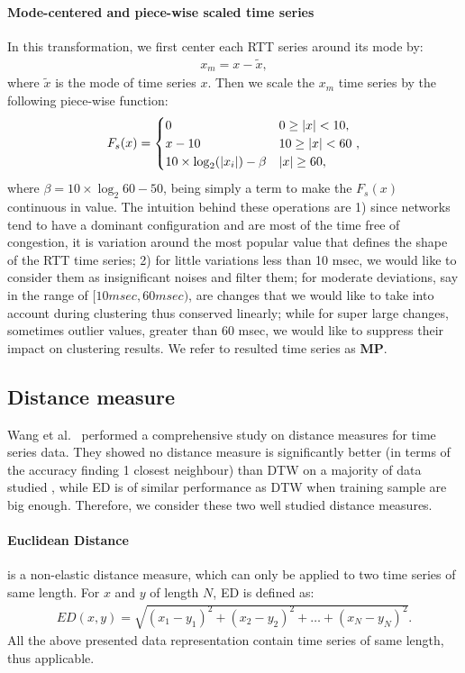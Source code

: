 \paragraph*{Mode-centered and piece-wise scaled time series}  In this transformation, we first center each RTT series around its mode by:
\begin{align*}
x_m = x-\tilde x,
\end{align*}
where $\tilde x$ is the mode of time series $x$. Then we scale the $x_m$ time series by the following piece-wise function:
\begin{align*}
F_s(x) =
\begin{cases} 
       0    \hfill & \text{$0 \geq |x| < 10$}, \\
       x-10 \hfill & \text{$10 \geq |x| < 60$ }, \\
       10 \times \log_2 (|x_i|) - \beta \hfill & \text{$|x|\geq 60$},\\
  \end{cases}
\end{align*}
where $\beta = 10 \times \log_2 60 - 50$, being simply a term to make the $F_s(x)$ continuous in value. 
The intuition behind these operations are 1) since networks tend to have a dominant configuration and are most of the time free of congestion, it is variation around the most popular value that defines the shape of the RTT time series; 2) for little variations less than 10 msec, we would like to consider them as insignificant noises and filter them; for moderate deviations, say in the range of $[10 msec, 60 msec)$, are changes that we would like to take into account during clustering thus conserved linearly; while for super large changes, sometimes outlier values, greater than 60 msec, we would like to suppress their impact on clustering results. We refer to resulted time series as \textbf{MP}.

\subsection{Distance measure}
Wang et al.\ \cite{Wang2013} performed a comprehensive study on distance measures for time series data. They showed no distance measure is significantly better (in terms of the accuracy finding 1 closest neighbour) than \acf{DTW} on a majority of data studied \cite{UCRArchive}, while \ac{ED} is of similar performance as \acf{DTW} when training sample are big enough. Therefore, we consider these two well studied distance measures.

\paragraph*{Euclidean Distance} is a non-elastic distance measure, which can only be applied to two time series of same length. For $x$ and $y$ of length $N$, ED is defined as:
\begin{align}
ED(x,y) = \sqrt{(x_1 - y_1)^2 + (x_2 - y_2)^2 + \dots + (x_N - y_N)^2}.
\end{align}
All the above presented data representation contain time series of same length, thus applicable.

